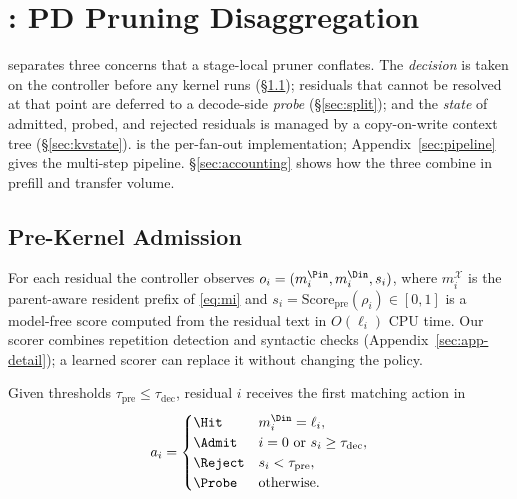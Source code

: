 \section{\sys: PD Pruning Disaggregation}
\label{sec:design}

\sys separates three concerns that a stage-local pruner conflates.
The \emph{decision} is taken on the controller before any kernel runs (\S\ref{sec:app}); residuals that cannot be resolved at that point are deferred to a decode-side \emph{probe} (\S\ref{sec:split}); and the \emph{state} of admitted, probed, and rejected residuals is managed by a copy-on-write context tree (\S\ref{sec:kvstate}).
 is the per-fan-out implementation; Appendix~\ref{sec:pipeline} gives the multi-step pipeline.
\S\ref{sec:accounting} shows how the three combine in prefill and transfer volume.

\subsection{Pre-Kernel Admission}
\label{sec:app}

For each residual the controller observes $o_i=(m_i^{\Pin},m_i^{\Din},s_i)$, where $m_i^{\mathcal{X}}$ is the parent-aware resident prefix of \eqref{eq:mi} and $s_i=\mathrm{Score}_{\mathrm{pre}}(\rho_i)\in[0,1]$ is a model-free score computed from the residual text in $O(\ell_i)$ CPU time.
Our scorer combines repetition detection and syntactic checks (Appendix~\ref{sec:app-detail}); a learned scorer can replace it without changing the policy.

\begin{definition}
\label{def:action}
Given thresholds $\tau_{\mathrm{pre}}\le\tau_{\mathrm{dec}}$, residual $i$ receives the first matching action in
\begin{equation}
\label{eq:action}
a_i=
\begin{cases}
\Hit & m_i^{\Din}=\ell_i,\\
\Admit & i=0\ \text{or}\ s_i\ge\tau_{\mathrm{dec}},\\
\Reject & s_i<\tau_{\mathrm{pre}},\\
\Probe & \text{otherwise}.
\end{cases}
\end{equation}
\end{definition}

